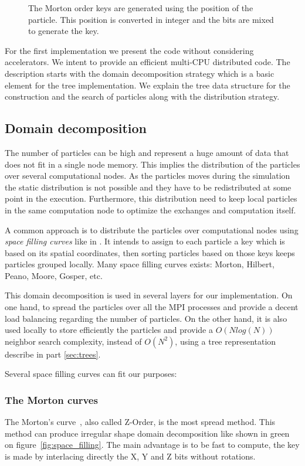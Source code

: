 \begin{figure}[t!]
\centering

\caption[Morton order keys generation]{The Morton order keys are generated using the position of the particle. This position is converted in integer and the bits are mixed to generate the key.}
\end{figure}

For the first implementation we present the code without considering accelerators. 
We intent to provide an efficient multi-CPU distributed code. 
The description starts with the domain decomposition strategy which is a basic element for the tree implementation.
We explain the tree data structure for the construction and the search of particles along with the distribution strategy.

\subsection{Domain decomposition}
\label{sec:domain_decomposition}
The number of particles can be high and represent a huge amount of data that does not fit in a single node memory. 
This implies the distribution of the particles over several computational nodes. 
As the particles moves during the simulation the static distribution is not possible and they have to be redistributed at some point in the execution. 
Furthermore, this distribution need to keep local particles in the same computation node to optimize the exchanges and computation itself.

A common approach is to distribute the particles over computational nodes using \textit{space filling curves} like in \cite{warren20132hot,springel2005cosmological,bedorf201424}. 
It intends to assign to each particle a key which is based on its spatial coordinates, then sorting particles based on those keys keeps particles grouped locally.
Many space filling curves exists: Morton, Hilbert, Peano, Moore, Gosper, etc.\

This domain decomposition is used in several layers for our implementation. 
On one hand, to spread the particles over all the MPI processes and provide a decent load balancing regarding the number of particles. 
On the other hand, it is also used locally to store efficiently the particles and provide a $O(N log(N))$ neighbor search complexity, instead of $O(N^2)$, using a tree representation describe in part \ref{sec:trees}. 

Several space filling curves can fit our purposes:
\subsubsection*{The Morton curves} The Morton's curve~\cite{morton1966computer}, also called Z-Order, is the most spread method. 
This method can produce irregular shape domain decomposition like shown in green on figure~\ref{fig:space_filling}. 
The main advantage is to be fast to compute, the key is made by interlacing directly the X, Y and Z bits without rotations. 

